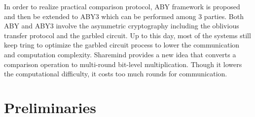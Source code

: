 \documentclass[letterpaper]{article} %
\begin{document}
    In order to realize practical comparison protocol, ABY framework \cite{ABY} is proposed
    and then be extended to ABY3 \cite{ABY3} which can be performed among 3 parties.
    Both ABY and ABY3 involve the asymmetric cryptography
    including the oblivious transfer protocol and the garbled circuit.
    Up to this day, most of the systems \cite{2022GarbledCircuit} still keep tring to optimize
    the garbled circuit process to lower the communication and computation complexity.
    Sharemind \cite{Sharemind} provides a new idea that converts a comparison operation to
    multi-round bit-level multiplication.
    Though it lowers the computational difficulty, it costs too much rounds for
    communication.

\section{Preliminaries}
\end{document}
